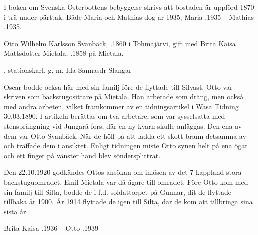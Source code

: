 I boken om Svenska Österbottens bebyggelse skrivs att bostaden är uppförd 1870 i trä under pärttak. Både Maria och Mathias dog år 1935; Maria .1935  --  Mathias .1935.



Otto Wilhelm Karlsson Svanbäck, .1860 i Tohmajärvi, gift med Brita Kaisa Mattsdotter Mietala, .1858 på Mietala.
\begin{jhchildren}
  \item {}
  \item {}
  \item {}
  \item {}
  \item {}, stationskarl, g. m. Ida Sannasdr Slangar
  \item {}
  \item {}
  \item {}
  \item {}
\end{jhchildren}
Oscar bodde också här med sin familj före de flyttade till Silvast. Otto var skriven som backstugosittare på Mietala. Han arbetade som dräng, men också med andra arbeten, vilket framkommer av en tidningsartikel i Wasa Tidning 30.03.1890. I artikeln berättas om två arbetare, som var sysselsatta med stensprängning vid Jungarå fors, där en ny kvarn skulle anläggas. Den ena av dem var Otto Svanbäck. När de höll på att ladda ett skott brann detsamma av och träffade dem i ansiktet. Enligt tidningen miste Otto synen helt på ena ögat och ett finger på vänster hand blev söndersplittrat.

Den 22.10.1920 godkändes Ottos ansökan om inlösen av det 7 kappland stora backstuguområdet. Emil Mietala var då ägare till
området. Före Otto kom med sin familj till Silta, bodde de i f.d. soldattorpet på Gunnar, dit de flyttade tillbaka år 1900. År 1914 flyttade de igen till Silta, där de kom att tillbringa sina sista år.

Brita Kaisa .1936  --  Otto .1939


